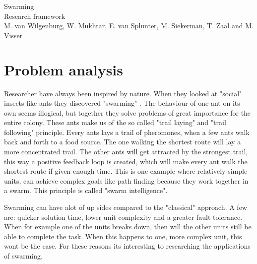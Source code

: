 \documentclass[10pt,a4paper]{article}
\begin{document}
\begin{titlepage}
    \centering
    \vfill
    {\Large
    Swarming\\
   
    {\small Research framework}\\
        
        \vskip2cm
        {\small M. van Wilgenburg, W. Mukhtar, E. van Splunter, M. Siekerman, T. Zaal and M. Visser}\\
    }    
    \vfill
    
    \vfill
    \vfill
\end{titlepage}

\newpage

\listoffigures
\newpage

\listoftables
\newpage
\tableofcontents
\newpage


\section{Problem analysis}
Researcher have always been inspired by nature. When they looked at "social" insects like ants they discovered "swarming"\cite{swarmwiki} . The behaviour of one ant on its own seems illogical, but together they solve problems of great importance for the entire colony. These ants make us of the so called "trail laying" and "trail following" principle. Every ants lays a trail of pheromones, when a few ants walk back and forth to a food source. The one walking the shortest route will lay a more concentrated trail. The other ants will get attracted by the strongest trail, this way a positive feedback loop is created, which will make every ant walk the shortest route if given enough time. This is one example where relatively simple units, can achieve complex goals like path finding because they work together in a swarm. This principle is called "swarm intelligence"\cite{swarmintelligence}.

Swarming can have alot of up sides compared to the "classical" approach. A few are: quicker solution time, lower unit complexity and a greater fault tolerance\cite{swarmintelligence}. When for example one of the units breaks down, then will the other units still be able to complete the task. When this happens to one, more complex unit, this wont be the case. For these reasons its interesting to researching the applications of swarming.
\end{document}
